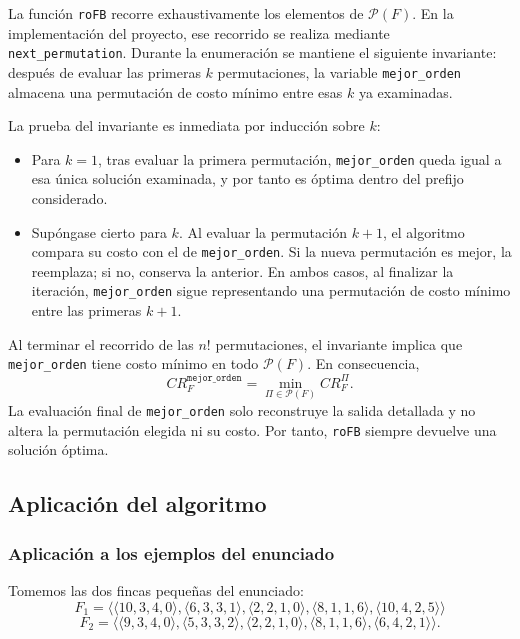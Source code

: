 \documentclass[12pt,a4paper]{article}
\begin{document}
La funci\'on \texttt{roFB} recorre exhaustivamente los elementos de \(\mathcal{P}(F)\).
En la implementaci\'on del proyecto, ese recorrido se realiza mediante \texttt{next\_permutation}.
Durante la enumeraci\'on se mantiene el siguiente invariante: despu\'es de evaluar las primeras \(k\) permutaciones, la variable \texttt{mejor\_orden} almacena una permutaci\'on de costo m\'inimo entre esas \(k\) ya examinadas.

La prueba del invariante es inmediata por inducci\'on sobre \(k\):
\begin{itemize}
  \item Para \(k=1\), tras evaluar la primera permutaci\'on, \texttt{mejor\_orden} queda igual a esa \'unica soluci\'on examinada, y por tanto es \'optima dentro del prefijo considerado.
  \item Sup\'ongase cierto para \(k\). Al evaluar la permutaci\'on \(k+1\), el algoritmo compara su costo con el de \texttt{mejor\_orden}. Si la nueva permutaci\'on es mejor, la reemplaza; si no, conserva la anterior. En ambos casos, al finalizar la iteraci\'on, \texttt{mejor\_orden} sigue representando una permutaci\'on de costo m\'inimo entre las primeras \(k+1\).
\end{itemize}

Al terminar el recorrido de las \(n!\) permutaciones, el invariante implica que \texttt{mejor\_orden} tiene costo m\'inimo en todo \(\mathcal{P}(F)\). En consecuencia,
\[
CR_F^{\texttt{mejor\_orden}}=\min_{\Pi \in \mathcal{P}(F)} CR_F^\Pi.
\]
La evaluaci\'on final de \texttt{mejor\_orden} solo reconstruye la salida detallada y no altera la permutaci\'on elegida ni su costo. Por tanto, \texttt{roFB} siempre devuelve una soluci\'on \'optima.

\subsection{Aplicaci\'on del algoritmo}

\subsubsection{Aplicaci\'on a los ejemplos del enunciado}

Tomemos las dos fincas peque\~nas del enunciado:
\[
F_1=\langle\langle 10,3,4,0\rangle,\langle 6,3,3,1\rangle,\langle 2,2,1,0\rangle,\langle 8,1,1,6\rangle,\langle 10,4,2,5\rangle\rangle
\]
\[
F_2=\langle\langle 9,3,4,0\rangle,\langle 5,3,3,2\rangle,\langle 2,2,1,0\rangle,\langle 8,1,1,6\rangle,\langle 6,4,2,1\rangle\rangle.
\]
\end{document}
